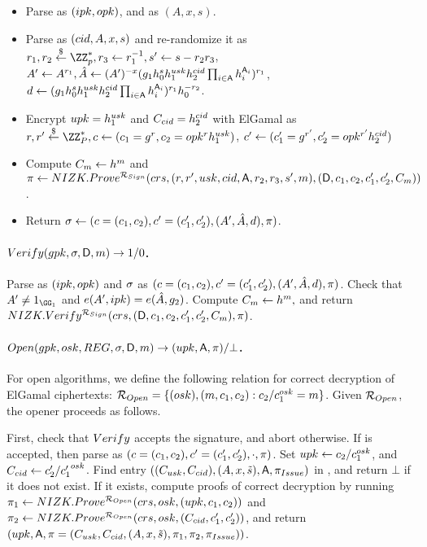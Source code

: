 \begin{itemize}
\item Parse \gpk as $(ipk,opk)$, and \cred as $(A,x,s)$.
\item Parse \cred as $(cid,A,x,s)$ and re-randomize it as $r_1,r_2 \getr
  \ZZ^*_p, r_3 \gets r_1^{-1}, s' \gets s - r_2r_3$, $A' \gets A^{r_1},
  \hat{A} \gets (A')^{-x}(g_1h_0^sh_1^{usk}h_2^{cid}
  \prod_{i \in \mathsf{A}}h_i^{\mathsf{A}_i})^{r_1}$,
  $d \gets (g_1h_0^sh_1^{usk}h_2^{cid}
  \prod_{i \in \mathsf{A}}h_i^{\mathsf{A}_i})^{r_1}h_0^{-r_2}$.
\item Encrypt $upk=h_1^{usk}$ and $C_{cid}=h_2^{cid}$
  with ElGamal as $r,r' \getr \ZZ^*_P,
  c \gets (c_1 = \gen{g}^r,c_2 = \opk^r\gen{h}_1^{\usk})$,
  $c' \gets (c'_1 = g^{r'},c'_2 = opk^{r'}h_2^{cid})$
\item Compute $C_{m} \gets h^m$ and
  $\pi \gets NIZK.Prove^{\mathcal{R}_{Sign}}(crs,
  (r,r',usk,cid,\mathsf{A},r_2,r_3,s',m), (\mathsf{D},c_1,c_2,c'_1,c'_2,C_{m}))$.
\item Return $\sigma \gets (c=(c_1,c_2),c'=(c'_1,c'_2),(A',\hat{A},d),\pi)$.
\end{itemize}

\paragraph{$Verify(gpk,\sigma,\mathsf{D},m) \rightarrow 1/0$.} %
Parse \gpk as $(ipk,opk)$ and $\sigma$ as $(c=(c_1,c_2),c'=(c'_1,c'_2),
(A',\hat{A},d), \pi)$. Check that $A' \neq 1_{\GG_1}$ and $e(A',ipk) =
e(\hat{A},g_2)$. Compute $C_{m} \gets h^m,$ and return
$NIZK.Verify^{\mathcal{R}_{Sign}}(crs,(\mathsf{D},c_1,c_2,c'_1,c'_2,C_{m}),
\pi)$.

\paragraph{$\Open(\gpk,\osk,\trans,\sig,\DAttrs,\msg)
  \rightarrow (\upk,\Attrs,\oproof)/\bot$.} %
For open algorithms, we define the following relation for correct decryption of
ElGamal ciphertexts: $\mathcal{R}_{Open} = \lbrace (osk),(m,c_1,c_2):
c_2/c_1^{osk} = m \rbrace$. Given $\mathcal{R}_{Open}$, the opener proceeds as
follows.

First, check that $Verify$ accepts the signature, and abort otherwise. If \sig
is accepted, then parse \sig as $(c=(c_1,c_2),c'=(c'_1,c'_2),\cdot,\pi)$.
Set $upk \gets c_2/c_1^{osk}$, and $C_{cid} \gets c'_2/{c'_1}^{osk}$. Find
entry $((C_{usk},C_{cid}),(A,x,\tilde{s}),\mathsf{A},\pi_{Issue})$ in \trans,
and return $\bot$ if it does not exist. If it exists, compute proofs of correct
decryption
by running $\pi_1 \gets NIZK.Prove^{\mathcal{R}_{Open}}(crs,osk,
(upk,c_1,c_2))$ and $\pi_2 \gets NIZK.Prove^{\mathcal{R}_{Open}}(crs,
osk,(C_{cid},c'_1,c'_2))$, and return $(upk,\mathsf{A},\pi = (C_{usk},
C_{cid},(A,x,\tilde{s}),\pi_1,\pi_2,\pi_{Issue}))$.

